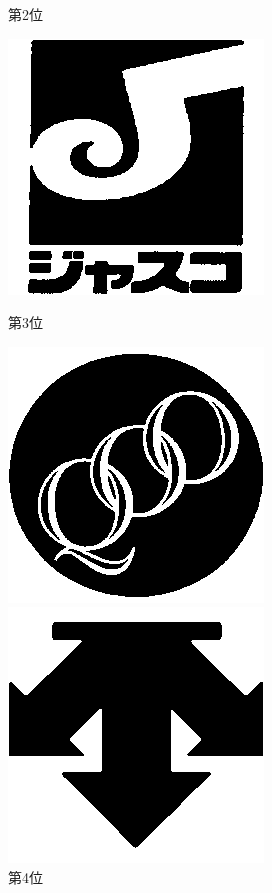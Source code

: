 \begin{figure}[htbp]
\begin{flushright}
\begin{minipage}[t]{0.16\hsize}
      \centering
      \caption{第2位}
      \label{graph:37}
    \end{minipage}
    \begin{minipage}[t]{0.16\hsize}
      \includegraphics[scale=0.3]{img/74.bmp}
      \centering
      \caption{第3位}
      \label{graph:38}
    \end{minipage}
    \begin{minipage}[t]{0.16\hsize}
      \includegraphics[scale=0.3]{img/2.bmp}
      \centering
      \caption{第4位}
      \label{graph:39}
    \end{minipage}
    \begin{minipage}[t]{0.16\hsize}
      \includegraphics[scale=0.3]{img/12.bmp}

\end{minipage}
\end{flushright}
\end{figure}
